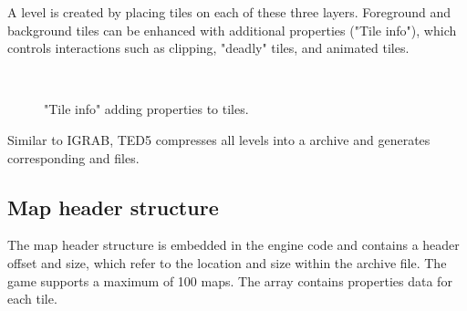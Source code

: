 \documentclass[book.tex]{subfiles}
\begin{document}
A level is created by placing tiles on each of these three layers. Foreground and background tiles can be enhanced with additional properties ("Tile info"), which controls interactions such as clipping, "deadly" tiles, and animated tiles. 

\par
\begin{figure}[H] 
  \centering 
  \\
  \caption{"Tile info" adding properties to tiles.}
\end{figure} 

 
\par
Similar to IGRAB, TED5 compresses all levels into a  archive and generates corresponding  and  files.

 
\subsection{Map header structure}
The map header structure is embedded in the engine code and contains a header offset and size, which refer to the location and size within the  archive file. The game supports a maximum of 100 maps. The  array contains properties data for each tile.\\

\par
\begin{minipage}{\textwidth}
 \par
 \end{minipage}
\end{document}
